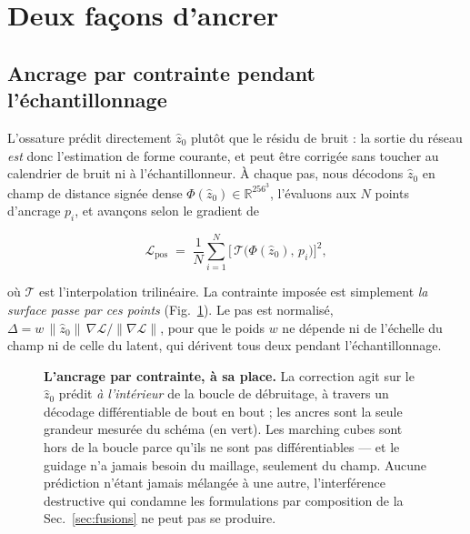 \documentclass[conference]{IEEEtran}
\begin{document}
\section{Deux façons d'ancrer}

\subsection{Ancrage par contrainte pendant l'échantillonnage}
\label{sec:constraint}

L'ossature prédit directement $\hat{z}_0$ plutôt que le résidu de bruit : la sortie du
réseau \emph{est} donc l'estimation de forme courante, et peut être corrigée sans
toucher au calendrier de bruit ni à l'échantillonneur. À chaque pas, nous décodons
$\hat{z}_0$ en champ de distance signée dense $\Phi(\hat{z}_0) \in
\mathbb{R}^{256^3}$, l'évaluons aux $N$ points d'ancrage $p_i$, et avançons selon le
gradient de

\begin{equation}
  \mathcal{L}_{\text{pos}} \;=\; \frac{1}{N}\sum_{i=1}^{N}
  \Big[\, \mathcal{T}\big(\Phi(\hat{z}_0),\, p_i \big) \Big]^2 ,
  \label{eq:loss}
\end{equation}

où $\mathcal{T}$ est l'interpolation trilinéaire. La contrainte imposée est simplement
\emph{la surface passe par ces points} (Fig.~\ref{fig:method}). Le pas est normalisé,
$\Delta = w \,\lVert \hat{z}_0 \rVert \, \nabla \mathcal{L} / \lVert \nabla
\mathcal{L}\rVert$, pour que le poids $w$ ne dépende ni de l'échelle du champ ni de
celle du latent, qui dérivent tous deux pendant l'échantillonnage.

\begin{figure}[t]
\centering
\resizebox{\textwidth}{!}{}
\caption{\textbf{L'ancrage par contrainte, à sa place.} La correction agit sur le
$\hat{z}_0$ prédit \emph{à l'intérieur} de la boucle de débruitage, à travers un
décodage différentiable de bout en bout ; les ancres sont la seule grandeur mesurée
du schéma (en vert). Les marching cubes sont hors de la boucle parce qu'ils ne sont pas
différentiables --- et le guidage n'a jamais besoin du maillage, seulement du champ.
Aucune prédiction n'étant jamais mélangée à une autre, l'interférence destructive qui
condamne les formulations par composition de la Sec.~\ref{sec:fusions} ne peut pas se
produire.}
\label{fig:method}
\end{figure}
\end{document}
